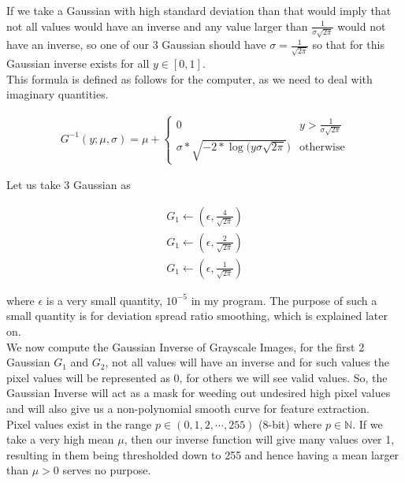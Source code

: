 \documentclass{article}
\begin{document}
If we take a Gaussian with high standard deviation than that would imply that not all values would have an
inverse and any value larger than $\frac{1}{\sigma \sqrt{2 \pi}}$ would not have an inverse, so one of our 3 Gaussian should have $\sigma = \frac{1}{\sqrt{2 \pi}}$ so that for this Gaussian inverse exists for all 
$y \in [0, 1]$. \\

This formula is defined as follows for the computer, as we need to deal with imaginary quantities.

\begin{align*}
    G^{-1}(y ; \mu, \sigma) = \mu + \begin{cases}
        0 & y > \frac{1}{\sigma \sqrt{2 \pi}} \\
        \sigma * \sqrt{-2 * \log(y \sigma \sqrt{2 \pi}}) & \text{otherwise}
    \end{cases}
\end{align*}

Let us take 3 Gaussian as 

\begin{align*}
    G_1 \gets (\epsilon, \frac{4}{\sqrt{2 \pi}}) \\
    G_1 \gets (\epsilon, \frac{2}{\sqrt{2 \pi}}) \\
    G_1 \gets (\epsilon, \frac{1}{\sqrt{2 \pi}})
\end{align*}

where $\epsilon$ is a very small quantity, $10^{-5}$ in my program. The purpose of such a small quantity is 
for deviation spread ratio smoothing, which is explained later on. \\

We now compute the Gaussian  Inverse of Grayscale Images, for the first 2 Gaussian $G_1$ and $G_2$, not all values will have an inverse and for such values the pixel values will be represented as 0, for others
we will see valid values. So, the Gaussian Inverse will act as a mask for weeding out undesired high
pixel values and will also give us a non-polynomial smooth curve for feature extraction. \\

Pixel values exist in the range $p \in (0, 1, 2, \cdots ,255)$ (8-bit) where $p \in \mathbb{N}$. If we  
take a very high mean $\mu$, then our inverse function will give many values over 1, resulting in them 
being thresholded down to 255 and hence having a mean larger than $\mu > 0$ serves no purpose.
\end{document}
